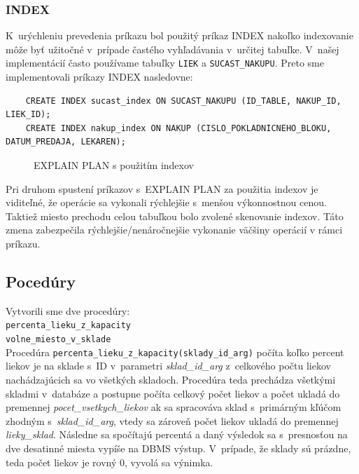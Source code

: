 \documentclass[a4paper, 11pt]{article}
\begin{document}
        \subsubsection{INDEX}
        K~urýchleniu prevedenia príkazu bol použitý príkaz INDEX nakoľko indexovanie môže byť užitočné v~prípade častého vyhľadávania v~určitej tabuľke. V~našej implementácií často používame tabuľky \texttt{LIEK} a \texttt{SUCAST\_NAKUPU}. 
        Preto sme implementovali príkazy INDEX nasledovne: \newpage
    \begin{lstlisting}
    CREATE INDEX sucast_index ON SUCAST_NAKUPU (ID_TABLE, NAKUP_ID, LIEK_ID);
    CREATE INDEX nakup_index ON NAKUP (CISLO_POKLADNICNEHO_BLOKU, DATUM_PREDAJA, LEKAREN);
    \end{lstlisting}
	\begin{figure}[h]
		\centering
		\caption{EXPLAIN PLAN s použitím indexov}
	\end{figure}
        Pri druhom spustení príkazov s~EXPLAIN PLAN za použitia indexov je viditeľné, že operácie sa vykonali rýchlejšie s~menšou výkonnostnou cenou. Taktiež miesto prechodu celou tabuľkou bolo zvolené skenovanie indexov. Táto zmena zabezpečila rýchlejšie/nenáročnejšie vykonanie väčšiny operácií v rámci príkazu.
	
	\subsection{Pocedúry} 
	Vytvorili sme dve procedúry:\\
	\texttt{percenta\_lieku\_z\_kapacity}\\
 	\texttt{volne\_miesto\_v\_sklade}\\
	
	Procedúra \texttt{percenta\_lieku\_z\_kapacity(sklady\_id\_arg)} počíta koľko percent liekov je na sklade s~ID v~parametri \emph{sklad\_id\_arg} z~celkového počtu liekov nachádzajúcich sa vo všetkých skladoch. Procedúra teda prechádza všetkými skladmi v~databáze a postupne počíta celkový počet liekov a počet ukladá do premennej \emph{pocet\_vsetkych\_liekov} ak sa spracováva sklad s~primárným kľúčom zhodným 
s~\emph{sklad\_id\_arg}, vtedy sa zároveň počet liekov ukladá do premennej \emph{lieky\_sklad}. Následne sa spočítajú percentá a daný výsledok sa s~presnosťou na dve desatinné miesta vypíše na DBMS výstup. V~prípade, že sklady sú prázdne, teda počet liekov je rovný 0, vyvolá sa výnimka.\\
	
\end{document}
